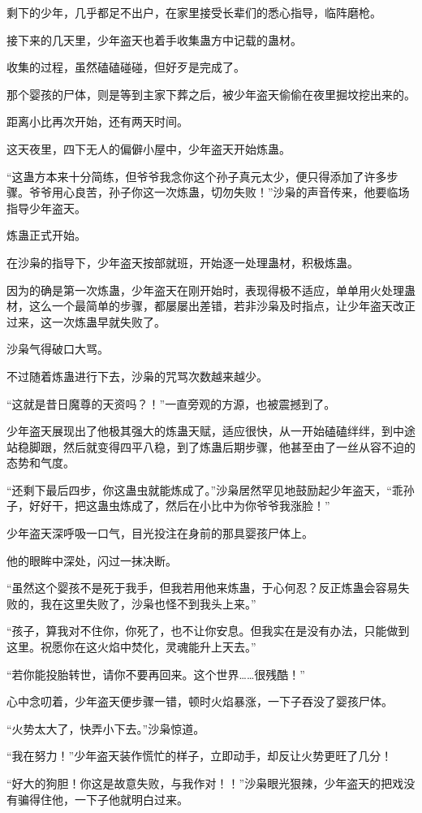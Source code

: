 \begin{this_body}
剩下的少年，几乎都足不出户，在家里接受长辈们的悉心指导，临阵磨枪。

接下来的几天里，少年盗天也着手收集蛊方中记载的蛊材。

收集的过程，虽然磕磕碰碰，但好歹是完成了。

那个婴孩的尸体，则是等到主家下葬之后，被少年盗天偷偷在夜里掘坟挖出来的。

距离小比再次开始，还有两天时间。

这天夜里，四下无人的偏僻小屋中，少年盗天开始炼蛊。

“这蛊方本来十分简练，但爷爷我念你这个孙子真元太少，便只得添加了许多步骤。爷爷用心良苦，孙子你这一次炼蛊，切勿失败！”沙枭的声音传来，他要临场指导少年盗天。

炼蛊正式开始。

在沙枭的指导下，少年盗天按部就班，开始逐一处理蛊材，积极炼蛊。

因为的确是第一次炼蛊，少年盗天在刚开始时，表现得极不适应，单单用火处理蛊材，这么一个最简单的步骤，都屡屡出差错，若非沙枭及时指点，让少年盗天改正过来，这一次炼蛊早就失败了。

沙枭气得破口大骂。

不过随着炼蛊进行下去，沙枭的咒骂次数越来越少。

“这就是昔日魔尊的天资吗？！”一直旁观的方源，也被震撼到了。

少年盗天展现出了他极其强大的炼蛊天赋，适应很快，从一开始磕磕绊绊，到中途站稳脚跟，然后就变得四平八稳，到了炼蛊后期步骤，他甚至由了一丝从容不迫的态势和气度。

“还剩下最后四步，你这蛊虫就能炼成了。”沙枭居然罕见地鼓励起少年盗天，“乖孙子，好好干，把这蛊虫炼成了，然后在小比中为你爷爷我涨脸！”

少年盗天深呼吸一口气，目光投注在身前的那具婴孩尸体上。

他的眼眸中深处，闪过一抹决断。

“虽然这个婴孩不是死于我手，但我若用他来炼蛊，于心何忍？反正炼蛊会容易失败的，我在这里失败了，沙枭也怪不到我头上来。”

“孩子，算我对不住你，你死了，也不让你安息。但我实在是没有办法，只能做到这里。祝愿你在这火焰中焚化，灵魂能升上天去。”

“若你能投胎转世，请你不要再回来。这个世界……很残酷！”

心中念叨着，少年盗天便步骤一错，顿时火焰暴涨，一下子吞没了婴孩尸体。

“火势太大了，快弄小下去。”沙枭惊道。

“我在努力！”少年盗天装作慌忙的样子，立即动手，却反让火势更旺了几分！

“好大的狗胆！你这是故意失败，与我作对！！”沙枭眼光狠辣，少年盗天的把戏没有骗得住他，一下子他就明白过来。

\end{this_body}


